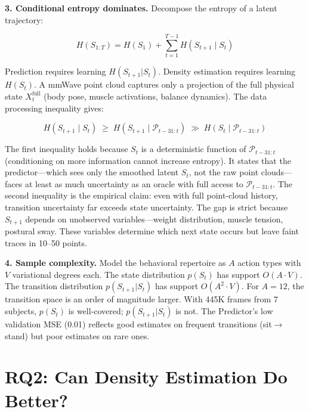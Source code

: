 \documentclass[11pt,a4paper]{article}
\begin{document}
\textbf{3. Conditional entropy dominates.}
Decompose the entropy of a latent trajectory:

\begin{equation}
H(S_{1:T}) = H(S_1) + \sum_{t=1}^{T-1} H(S_{t+1} \mid S_t)
\end{equation}

Prediction requires learning $H(S_{t+1}|S_t)$. Density estimation requires learning $H(S_t)$.
A mmWave point cloud captures only a projection of the full physical state $X_t^{\text{full}}$ (body pose, muscle activations, balance dynamics).
The data processing inequality gives:

\begin{equation}
H(S_{t+1} \mid S_t) \;\geq\; H(S_{t+1} \mid \mathcal{P}_{t-31:t}) \;\gg\; H(S_t \mid \mathcal{P}_{t-31:t})
\end{equation}

The first inequality holds because $S_t$ is a deterministic function of $\mathcal{P}_{t-31:t}$ (conditioning on more information cannot increase entropy).
It states that the predictor---which sees only the smoothed latent $S_t$, not the raw point clouds---faces at least as much uncertainty as an oracle with full access to $\mathcal{P}_{t-31:t}$.
The second inequality is the empirical claim: even with full point-cloud history, transition uncertainty far exceeds state uncertainty.
The gap is strict because $S_{t+1}$ depends on unobserved variables---weight distribution, muscle tension, postural sway.
These variables determine which next state occurs but leave faint traces in 10--50 points.

\textbf{4. Sample complexity.}
Model the behavioral repertoire as $A$ action types with $V$ variational degrees each.
The state distribution $p(S_t)$ has support $O(A \cdot V)$.
The transition distribution $p(S_{t+1}|S_t)$ has support $O(A^2 \cdot V)$.
For $A=12$, the transition space is an order of magnitude larger.
With 445K frames from 7 subjects, $p(S_t)$ is well-covered; $p(S_{t+1}|S_t)$ is not.
The Predictor's low validation MSE (0.01) reflects good estimates on frequent transitions (sit$\to$stand) but poor estimates on rare ones.

\section{RQ2: Can Density Estimation Do Better?}
\end{document}
